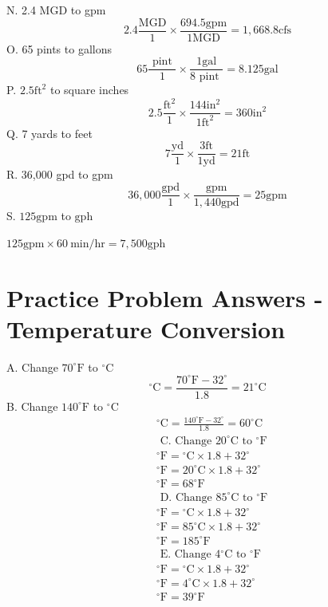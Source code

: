\documentclass[10pt]{article}
\begin{document}
N. 2.4 MGD to gpm
$$
2.4 \frac{\mathrm{MGD}}{1} \times \frac{694.5 \mathrm{gpm}}{1 \mathrm{MGD}}=1,668.8 \mathrm{cfs}
$$
O. 65 pints to gallons
$$
65 \frac{\text { pint }}{1} \times \frac{1 \mathrm{gal}}{8 \text { pint }}=8.125 \mathrm{gal}
$$
P. $2.5 \mathrm{ft}^{2}$ to square inches
$$
2.5 \frac{\mathrm{ft}^{2}}{1} \times \frac{144 \mathrm{in}^{2}}{1 \mathrm{ft}^{2}}=360 \mathrm{in}^{2}
$$
Q. 7 yards to feet
$$
7 \frac{\mathrm{yd}}{1} \times \frac{3 \mathrm{ft}}{1 \mathrm{yd}}=21 \mathrm{ft}
$$
R. 36,000 gpd to gpm
$$
36,000 \frac{\mathrm{gpd}}{1} \times \frac{\mathrm{gpm}}{1,440 \mathrm{gpd}}=25 \mathrm{gpm}
$$
S. $125 \mathrm{gpm}$ to $\mathrm{gph}$

$125 \mathrm{gpm} \times 60 \mathrm{~min} / \mathrm{hr}=7,500 \mathrm{gph}$

\section{Practice Problem Answers - Temperature Conversion}
A. Change $70^{\circ} \mathrm{F}$ to ${ }^{\circ} \mathrm{C}$
$$
{ }^{\circ} \mathrm{C}=\frac{70^{\circ} \mathrm{F}-32^{\circ}}{1.8}=21^{\circ} \mathrm{C}
$$
B. Change $140^{\circ} \mathrm{F}$ to ${ }^{\circ} \mathrm{C}$
$$
\begin{aligned}
&{ }^{\circ} \mathrm{C}=\frac{140^{\circ} \mathrm{F}-32^{\circ}}{1.8}=60^{\circ} \mathrm{C} \\
&\text { C. Change } 20^{\circ} \mathrm{C} \text { to }{ }^{\circ} \mathrm{F} \\
&{ }^{\circ} \mathrm{F}={ }^{\circ} \mathrm{C} \times 1.8+32^{\circ} \\
&{ }^{\circ} \mathrm{F}=20^{\circ} \mathrm{C} \times 1.8+32^{\circ} \\
&{ }^{\circ} \mathrm{F}=68^{\circ} \mathrm{F} \\
&\text { D. Change } 85^{\circ} \mathrm{C} \text { to }{ }^{\circ} \mathrm{F} \\
&{ }^{\circ} \mathrm{F}={ }^{\circ} \mathrm{C} \times 1.8+32^{\circ} \\
&{ }^{\circ} \mathrm{F}=85^{\circ} \mathrm{C} \times 1.8+32^{\circ} \\
&{ }^{\circ} \mathrm{F}=185^{\circ} \mathrm{F} \\
&\text { E. Change } 4{ }^{\circ} \mathrm{C} \text { to }{ }^{\circ} \mathrm{F} \\
&{ }^{\circ} \mathrm{F}={ }^{\circ} \mathrm{C} \times 1.8+32^{\circ} \\
&{ }^{\circ} \mathrm{F}=4^{\circ} \mathrm{C} \times 1.8+32^{\circ} \\
&{ }^{\circ} \mathrm{F}=39^{\circ} \mathrm{F}
\end{aligned}
$$
\end{document}
